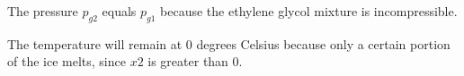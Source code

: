 The pressure \( p_{g2} \) equals \( p_{g1} \) because the ethylene glycol mixture is incompressible.

The temperature will remain at 0 degrees Celsius because only a certain portion of the ice melts, since \( x2 \) is greater than 0.